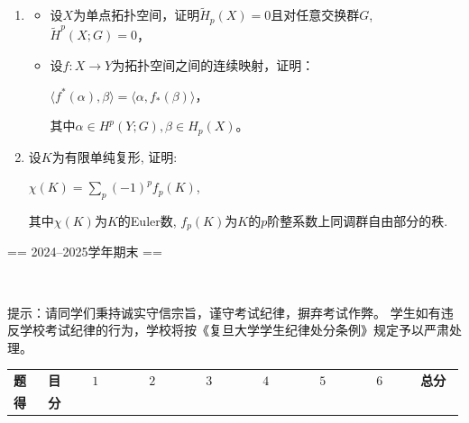 \begin{enumerate}
    \item \begin{itemize}
        \item [(1)] 设$X$为单点拓扑空间，证明$\widetilde{H}_p(X) = 0$且对任意交换群$G$, $\widetilde{H}^p(X; G) = 0$，
        \item [(2)] 设$f: X \rightarrow Y$为拓扑空间之间的连续映射，证明：
        \begin{center}
            $\langle f^*(\alpha), \beta \rangle = \langle \alpha, f_*(\beta) \rangle$，
        \end{center}
        其中$\alpha \in H^p(Y; G), \beta \in H_p(X)$。
    \end{itemize}

    \item  设$K$为有限单纯复形, 证明:
    \begin{center}
        $\chi(K) = \sum_p (-1)^pf_p(K)$,
    \end{center}
    其中$\chi(K)$为$K$的Euler数, $f_p(K)$为$K$的$p$阶整系数上同调群自由部分的秩.
\end{enumerate}

== 2024--2025学年期末 ==

\begin{center}
\end{center}
\\
\begin{center}
\end{center}
\qquad 提示：请同学们秉持诚实守信宗旨，谨守考试纪律，摒弃考试作弊。
学生如有违反学校考试纪律的行为，学校将按《复旦大学学生纪律处分条例》规定予以严肃处理。
\begin{center}\begin{tabular}{cccccccc}
\textbf{题\ \ \ 目} &\ \ \ $1$\ \ \ &\ \ \ $2$\ \ \ &\ \ \ $3$\ \ \ &\ \ \ $4$\ \ \ &\ \ \ $5$\ \ \ &\ \ \ $6$\ \ \ &\ \textbf{总分}\ \\
\textbf{得\ \ \ 分} & & & & & & & 
\end{tabular}\end{center}

